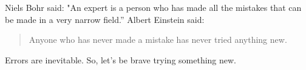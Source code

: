 \documentclass{article}
\begin{document}
Niels Bohr said: "An expert is a person who has made
all the mistakes that can be made in a very narrow field.''
Albert Einstein said:
\begin{quote}
Anyone who has never made a mistake has never tried anything new.
\end{quote}
Errors are inevitable. So, let's be brave trying something new.
\end{document}
